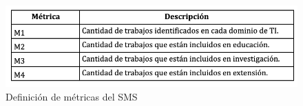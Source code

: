 \begin{figure}[H]
    \centering
    \includegraphics[width=\textwidth] {tablas-images/cp2/definicionMetricas.png}
    \caption{Definición de métricas del SMS}\label{fig:tabla-metricas}
\end{figure}